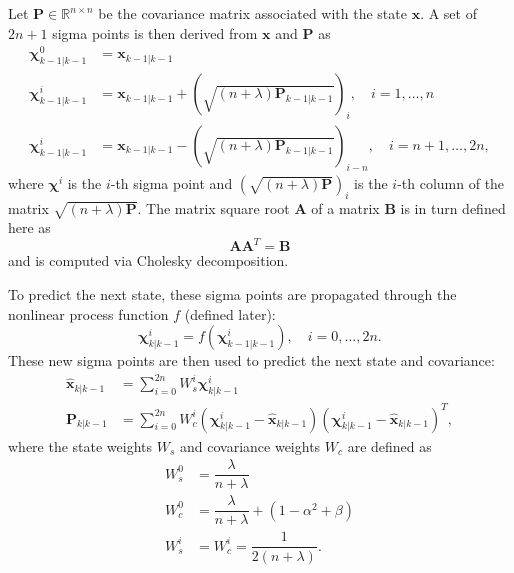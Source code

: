 Let $\mathbf{P} \in \mathbb{R}^{n \times n}$ be the covariance matrix associated with the state $\mathbf{x}$. A set of $2n + 1$ sigma points is then derived from $\mathbf{x}$ and $\mathbf{P}$ as
%
\begin{align}
\mathbf{\chi}^{0}_{k-1 | k-1} &= \mathbf{x}_{k-1 | k-1} \nonumber\\
\mathbf{\chi}^{i}_{k-1 | k-1} &= \mathbf{x}_{k-1 | k-1} + \left( \sqrt{\left( n + \lambda \right) \mathbf{P}_{k-1 | k-1}} \right)_{i}, \quad i = 1, \dots, n \\
\mathbf{\chi}^{i}_{k-1 | k-1} &= \mathbf{x}_{k-1 | k-1} - \left( \sqrt{\left( n + \lambda \right) \mathbf{P}_{k-1 | k-1}} \right)_{i-n}, \quad i = n+1, \dots, 2n, \nonumber
\end{align}
%
where $\mathbf{\chi}^{i}$ is the $i$-th sigma point and $\left( \sqrt{\left( n + \lambda \right) \mathbf{P}} \right)_{i}$ is the $i$-th column of the matrix $\sqrt{\left( n + \lambda \right) \mathbf{P}}$. The matrix square root $\mathbf{A}$ of a matrix $\mathbf{B}$ is in turn defined here as
%
\begin{equation}
\mathbf{A} \mathbf{A}^{T} = \mathbf{B}
\end{equation}
%
and is computed via Cholesky decomposition.

To predict the next state, these sigma points are propagated through the nonlinear process function $f$ (defined later):
%
\begin{equation}
\mathbf{\chi}^{i}_{k | k-1} = f \left( \mathbf{\chi}^{i}_{k-1 | k-1} \right), \quad i = 0, \dots, 2n.
\end{equation}
%
These new sigma points are then used to predict the next state and covariance:
%
\begin{align}
\hat{\mathbf{x}}_{k | k-1} &= \sum^{2n}_{i=0} W^{i}_{s} \mathbf{\chi}^{i}_{k | k-1} \\
\mathbf{P}_{k | k-1} &= \sum^{2n}_{i=0} W^{i}_{c} \left( \mathbf{\chi}^{i}_{k | k-1} - \hat{\mathbf{x}}_{k | k-1} \right) \left( \mathbf{\chi}^{i}_{k | k-1} - \hat{\mathbf{x}}_{k | k-1} \right)^{T},
\end{align}
%
where the state weights $W_{s}$ and covariance weights $W_{c}$ are defined as
%
\begin{align}
W^{0}_{s} &= \dfrac{\lambda}{n + \lambda} \nonumber \\
W^{0}_{c} &= \dfrac{\lambda}{n + \lambda} + \left( 1 - \alpha^{2} + \beta \right) \\
W^{i}_{s} &= W^{i}_{c} = \dfrac{1}{2 \left(n + \lambda \right)} . \nonumber
\end{align}

